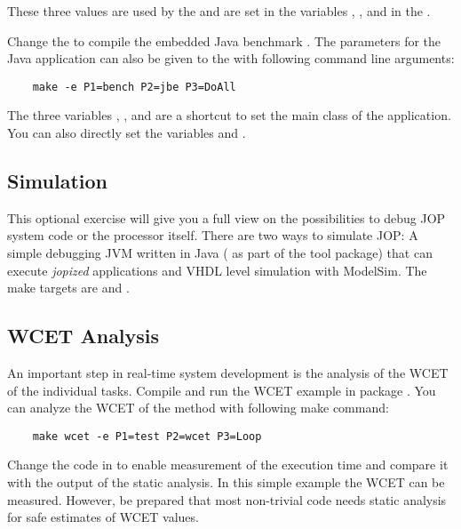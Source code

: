 These three values are used by the  and are set in the
variables , , and  in the
.

Change the  to compile the embedded Java benchmark
. The parameters for the Java application can also
be given to the  with following command line arguments:
\begin{verbatim}
    make -e P1=bench P2=jbe P3=DoAll
\end{verbatim}

The three variables , , and  are a
shortcut to set the main class of the application. You can also
directly set the variables  and
.


\subsection{Simulation}

This optional exercise will give you a full view on the
possibilities to debug JOP system code or the processor itself.
There are two ways to simulate JOP: A simple debugging JVM written
in Java ( as part of the tool package) that can execute
\emph{jopized} applications and VHDL level simulation with ModelSim.
The make targets are  and .

\subsection{WCET Analysis}

An important step in real-time system development is the analysis of
the WCET of the individual tasks. Compile and run the WCET example
 in package . You can analyze the WCET of
the method  with following make command:
\begin{verbatim}
    make wcet -e P1=test P2=wcet P3=Loop
\end{verbatim}
Change the code in  to enable measurement of the
execution time and compare it with the output of the static
analysis. In this simple example the WCET can be measured. However,
be prepared that most non-trivial code needs static analysis for
safe estimates of WCET values.
